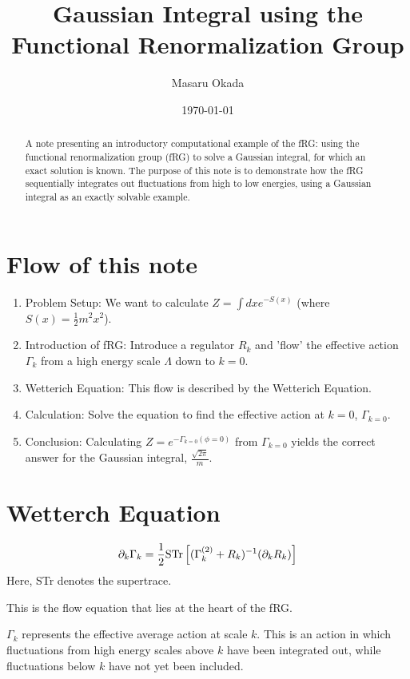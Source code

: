 \documentclass[uplatex,a4j,12pt,dvipdfmx]{jsarticle}
\title{
Gaussian Integral using the Functional Renormalization Group
}
\author{Masaru Okada}
\date{\today}
\begin{document}
\maketitle

\begin{abstract}
A note presenting an introductory computational example of the fRG:
using the functional renormalization group (fRG) to solve a Gaussian integral,
for which an exact solution is known.
The purpose of this note is to demonstrate how the fRG sequentially integrates out
fluctuations from high to low energies, using a Gaussian integral as an
exactly solvable example.
\end{abstract}

\tableofcontents
\section{Flow of this note}

\begin{enumerate}
    \item Problem Setup: We want to calculate $Z = \int dx e^{-S(x)}$ (where $S(x) = \frac{1}{2}m^2 x^2$).
    \item Introduction of fRG: Introduce a regulator $R_k$ and 'flow' the effective action $\Gamma_k$ from a high energy scale $\Lambda$ down to $k=0$.
    \item Wetterich Equation: This flow is described by the Wetterich Equation.
    \item Calculation: Solve the equation to find the effective action at $k=0$, $\Gamma_{k=0}$.
    \item Conclusion: Calculating $Z = e^{-\Gamma_{k=0}(\phi=0)}$ from $\Gamma_{k=0}$ yields the correct answer for the Gaussian integral, $\frac{\sqrt{2\pi}}{m}$.
\end{enumerate}

\section{Wetterch Equation}

\[
    \partial_{k} \Gamma_{k}
    =
    \frac{1}{2} {\rm STr} \left[ (\Gamma^{(2)}_{k} + R_{k})^{-1} (\partial_{k} R_{k}) \right]
\]
Here, STr denotes the supertrace.

This is the flow equation that lies at the heart of the fRG.

$\Gamma_{k}$ represents the effective average action at scale $k$.
This is an action in which fluctuations from high energy scales above $k$ have been integrated out,
while fluctuations below $k$ have not yet been included.
\end{document}
